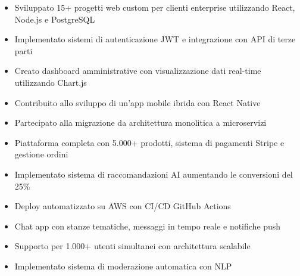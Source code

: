 \documentclass[10pt,a4paper,ragged2e,withhyper]{altacv}
\begin{document}
\divider

\begin{itemize}
\item Sviluppato 15+ progetti web custom per clienti enterprise utilizzando React, Node.js e PostgreSQL
\item Implementato sistemi di autenticazione JWT e integrazione con API di terze parti
\item Creato dashboard amministrative con visualizzazione dati real-time utilizzando Chart.js
\end{itemize}

\divider

\begin{itemize}
\item Contribuito allo sviluppo di un'app mobile ibrida con React Native
\item Partecipato alla migrazione da architettura monolitica a microservizi
\end{itemize}


\begin{itemize}
\item Piattaforma completa con 5.000+ prodotti, sistema di pagamenti Stripe e gestione ordini
\item Implementato sistema di raccomandazioni AI aumentando le conversioni del 25\%
\item Deploy automatizzato su AWS con CI/CD GitHub Actions
\end{itemize}

\divider

\begin{itemize}
\item Chat app con stanze tematiche, messaggi in tempo reale e notifiche push
\item Supporto per 1.000+ utenti simultanei con architettura scalabile
\item Implementato sistema di moderazione automatica con NLP
\end{itemize}

\end{document}
